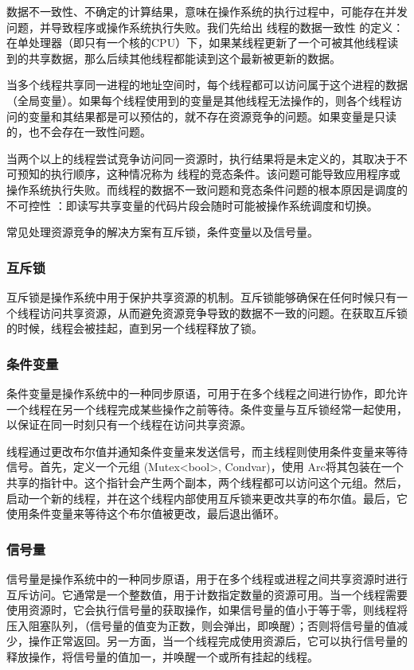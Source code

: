 数据不一致性、不确定的计算结果，意味在操作系统的执行过程中，可能存在并发问题，并导致程序或操作系统执行失败。我们先给出 线程的数据一致性 的定义：在单处理器（即只有一个核的CPU）下，如果某线程更新了一个可被其他线程读到的共享数据，那么后续其他线程都能读到这个最新被更新的数据。

当多个线程共享同一进程的地址空间时，每个线程都可以访问属于这个进程的数据（全局变量）。如果每个线程使用到的变量是其他线程无法操作的，则各个线程访问的变量和其结果都是可以预估的，就不存在资源竞争的问题。如果变量是只读的，也不会存在一致性问题。

当两个以上的线程尝试竞争访问同一资源时，执行结果将是未定义的，其取决于不可预知的执行顺序，这种情况称为 线程的竞态条件。该问题可能导致应用程序或操作系统执行失败。而线程的数据不一致问题和竞态条件问题的根本原因是调度的不可控性 ：即读写共享变量的代码片段会随时可能被操作系统调度和切换。

常见处理资源竞争的解决方案有互斥锁，条件变量以及信号量。

\subsubsection{互斥锁}

互斥锁是操作系统中用于保护共享资源的机制。互斥锁能够确保在任何时候只有一个线程访问共享资源，从而避免资源竞争导致的数据不一致的问题。在获取互斥锁的时候，线程会被挂起，直到另一个线程释放了锁。

\subsubsection{条件变量}

条件变量是操作系统中的一种同步原语，可用于在多个线程之间进行协作，即允许一个线程在另一个线程完成某些操作之前等待。条件变量与互斥锁经常一起使用，以保证在同一时刻只有一个线程在访问共享资源。

线程通过更改布尔值并通知条件变量来发送信号，而主线程则使用条件变量来等待信号。首先，定义一个元组 (Mutex<bool>, Condvar)，使用 Arc将其包装在一个共享的指针中。这个指针会产生两个副本，两个线程都可以访问这个元组。然后，启动一个新的线程，并在这个线程内部使用互斥锁来更改共享的布尔值。最后，它使用条件变量来等待这个布尔值被更改，最后退出循环。

\subsubsection{信号量}

信号量是操作系统中的一种同步原语，用于在多个线程或进程之间共享资源时进行互斥访问。它通常是一个整数值，用于计数指定数量的资源可用。当一个线程需要使用资源时，它会执行信号量的获取操作，如果信号量的值小于等于零，则线程将压入阻塞队列，（信号量的值变为正数，则会弹出，即唤醒）；否则将信号量的值减少，操作正常返回。另一方面，当一个线程完成使用资源后，它可以执行信号量的释放操作，将信号量的值加一，并唤醒一个或所有挂起的线程。